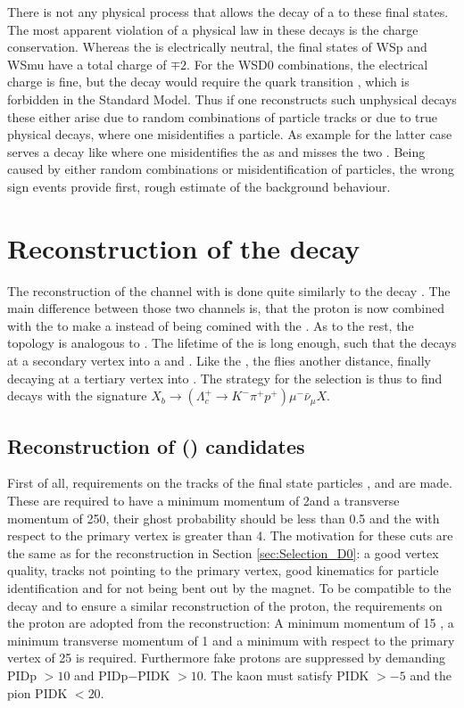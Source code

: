 There is not any physical process that allows the decay of a \Lb to these final states.
The most apparent violation of a physical law in these decays is the charge conservation.
Whereas the \Lb is electrically neutral, the final states of WSp and WSmu have a total charge of $\mp 2$.
For the WSD0 combinations, the electrical charge is fine, but the decay \decay{\Lb}{\Dzb\proton\mun} would require the quark transition \bquark \to \cquarkbar, which is forbidden in the Standard Model.
Thus if one reconstructs such unphysical decays these either arise due to random combinations of particle tracks or due to true physical decays, where one misidentifies a particle.
As example for the latter case serves a decay like \decay{\Bz}{\Dz\mun\pip\pip\piz} where one misidentifies the \piz as \antiproton and misses the two \pip.
Being caused by either random combinations or misidentification of particles, the wrong sign events provide first, rough estimate of the \LbToDpmunuX background behaviour.

\section{Reconstruction of the decay \LbToLcmunu}
The reconstruction of the \LbToLcmunu channel with \LcTopKpi is done quite similarly to the decay \LbToDpmunuX.
The main difference between those two channels is, that the proton is now combined with the \Km\pip to make a \LcTopKpi instead of being comined with the \Dz\mun.
As to the rest, the topology is analogous to \LbToDpmunuX.
The lifetime of the \Lb is long enough, such that the \Lb decays at a secondary vertex into a \Lc and \mun.
Like the \Dz, the \Lc flies another distance, finally decaying at a tertiary vertex into \pKpi.
The strategy for the selection is thus to find decays with the signature $X_{b} \rightarrow (\Lambda_c^+ \rightarrow K^- \pi^+ p^+) \mu^- \bar{\nu}_{\mu} X$.

\subsection{Reconstruction of \Lc (\pKpi) candidates}
First of all, requirements on the tracks of the final state particles \proton, \kaon and \pion are made.
These are required to have a minimum momentum of 2\gev and a transverse momentum of 250\mev, their ghost probability should be less than 0.5 and the \chisqip with respect to the primary vertex is greater than 4.
The motivation for these cuts are the same as for the \Dz reconstruction in Section \ref{sec:Selection_D0}:
a good vertex quality, tracks not pointing to the primary vertex, good kinematics for particle identification and for not being bent out by the magnet.
To be compatible to the \LbToDpmunuX decay and to ensure a similar reconstruction of the proton, the requirements on the proton are adopted from the \LbToDpmunuX reconstruction:
A minimum momentum of 15 \gev, a minimum transverse momentum of 1 \gev and a minimum \chisqip with respect to the primary vertex of 25 is required.
Furthermore fake protons are suppressed by demanding PIDp $> 10$ and PIDp$-$PIDK $> 10$.
The kaon must satisfy PIDK $>-5$ and the pion PIDK $< 20$.

